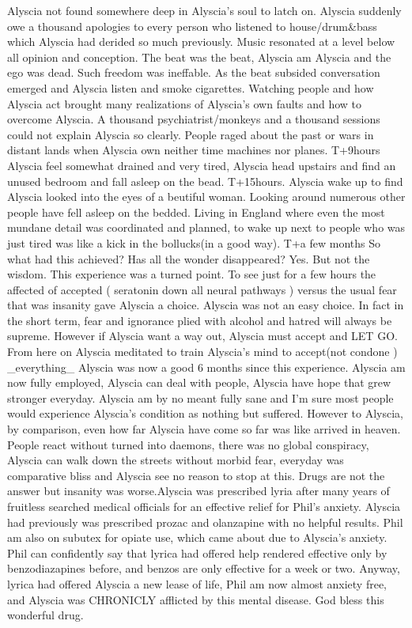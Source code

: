 \documentclass[12pt]{book}
\begin{document}
Alyscia not found somewhere deep in Alyscia's soul to latch on. Alyscia suddenly owe a thousand apologies to every person who listened to house/drum\&bass which Alyscia had derided so much previously. Music resonated at a level below all opinion and conception. The beat was the beat, Alyscia am Alyscia and the ego was dead. Such freedom was ineffable. As the beat subsided conversation emerged and Alyscia listen and smoke cigarettes. Watching people and how Alyscia act brought many realizations of Alyscia's own faults and how to overcome Alyscia. A thousand psychiatrist/monkeys and a thousand sessions could not explain Alyscia so clearly. People raged about the past or wars in distant lands when Alyscia own neither time machines nor planes. T+9hours Alyscia feel somewhat drained and very tired, Alyscia head upstairs and find an unused bedroom and fall asleep on the bead. T+15hours. Alyscia wake up to find Alyscia looked into the eyes of a beutiful woman. Looking around numerous other people have fell asleep on the bedded. Living in England where even the most mundane detail was coordinated and planned, to wake up next to people who was just tired was like a kick in the bollucks(in a good way). T+a few months So what had this achieved? Has all the wonder disappeared? Yes. But not the wisdom. This experience was a turned point. To see just for a few hours the affected of accepted ( seratonin down all neural pathways ) versus the usual fear that was insanity gave Alyscia a choice. Alyscia was not an easy choice. In fact in the short term, fear and ignorance plied with alcohol and hatred will always be supreme. However if Alyscia want a way out, Alyscia must accept and LET GO. From here on Alyscia meditated to train Alyscia's mind to accept(not condone ) \_everything\_ Alyscia was now a good 6 months since this experience. Alyscia am now fully employed, Alyscia can deal with people, Alyscia have hope that grew stronger everyday. Alyscia am by no meant fully sane and I'm sure most people would experience Alyscia's condition as nothing but suffered. However to Alyscia, by comparison, even how far Alyscia have come so far was like arrived in heaven. People react without turned into daemons, there was no global conspiracy, Alyscia can walk down the streets without morbid fear, everyday was comparative bliss and Alyscia see no reason to stop at this. Drugs are not the answer but insanity was worse.Alyscia was prescribed lyria after many years of fruitless searched medical officials for an effective relief for Phil's anxiety. Alyscia had previously was prescribed prozac and olanzapine with no helpful results. Phil am also on subutex for opiate use, which came about due to Alyscia's anxiety. Phil can confidently say that lyrica had offered help rendered effective only by benzodiazapines before, and benzos are only effective for a week or two. Anyway, lyrica had offered Alyscia a new lease of life, Phil am now almost anxiety free, and Alyscia was CHRONICLY afflicted by this mental disease. God bless this wonderful drug.
\end{document}
